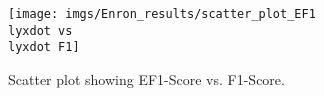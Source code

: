 \begin{figure}[H]
\begin{centering}
\par\end{centering}
\begin{centering}
\texttt{[image: imgs/Enron\_results/scatter\_plot\_EF1\\lyxdot vs\\lyxdot F1]}
\par\end{centering}
\caption{Scatter plot showing EF1-Score vs. F1-Score.}
\label{fig:F1_vs_EF1}
\end{figure}





